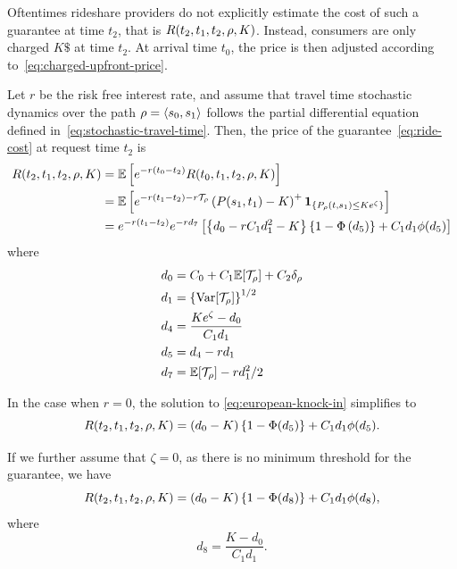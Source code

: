 \documentclass[12pt]{article}
\begin{document}
{{{{{{{Oftentimes rideshare providers do not explicitly estimate the cost of such a guarantee at time $t_2$, that is $R(t_2, t_1, t_2, \rho, K)$. Instead, consumers are only charged $K\$$ at time $t_2$. At arrival time $t_0$, the price is then adjusted according to~\eqref{eq:charged-upfront-price}.  

Let $r$ be the risk free interest rate, and assume that travel time stochastic dynamics over the path $\rho = {\langle {s_0},{ s_1}\rangle }$ follows the partial differential equation defined in~\eqref{eq:stochastic-travel-time}. Then, the price of the guarantee~\eqref{eq:ride-cost} at request time $t_2$ is 
\begin{equation}\label{eq:european-knock-in}
\begin{aligned}
 R(t_2,t_1,t_2, \rho, K) &= \mathbb{E}\left[e^{-r(t_0-t_2)}R(t_0,t_1, t_2, \rho, K)\right] \\
  &= \mathbb{E}\left[e^{-r(t_1-t_2) -r\mathcal{T}_\rho}\left(P({ s_1}, t_1) - K\right)^+ {\bm 1}_{\left\{P_\rho(t, { s_1}) \leq Ke^\zeta\right\}}\right]  \\
  &=e^{-r(t_1-t_2)} e^{-rd_7}\left[\left\{d_0 - rC_1d_1^2- K\right\}\left\{1-\Phi\left(d_5\right)\right\} + C_1d_1 \phi(d_5)\right] \\
    \end{aligned}
\end{equation}
where 
\begin{align*}
    d_0 & = C_0 + C_1\mathbb{E}[\mathcal{T}_\rho] + C_2\delta_\rho\\ 
    d_1 &= \left\{\operatorname{{\rm Var}}[\mathcal{T}_\rho]\right\}^{1/2} \\
    d_4 &= \frac{Ke^\zeta -d_0}{C_1d_1} \\
    d_5 &= d_4 - rd_1\\
    d_7 &= \mathbb{E}[\mathcal{T}_\rho] - rd_1^2/2
\end{align*}

In the case when $r=0$, the solution to \eqref{eq:european-knock-in} simplifies to 
\[ R(t_2,t_1,t_2, \rho, K) = (d_0-K)\left\{1- \Phi(d_5)\right\} + C_1d_1\phi(d_5).\]

If we further assume that $\zeta=0$, as there is no minimum threshold for the guarantee, we have 
\[ R(t_2,t_1,t_2, \rho, K) = (d_0-K)\left\{1- \Phi(d_8)\right\} + C_1d_1\phi(d_8),\]
where
\[d_8 = \frac{K - d_0}{C_1d_1}.\]

}}}}}}}
\end{document}
